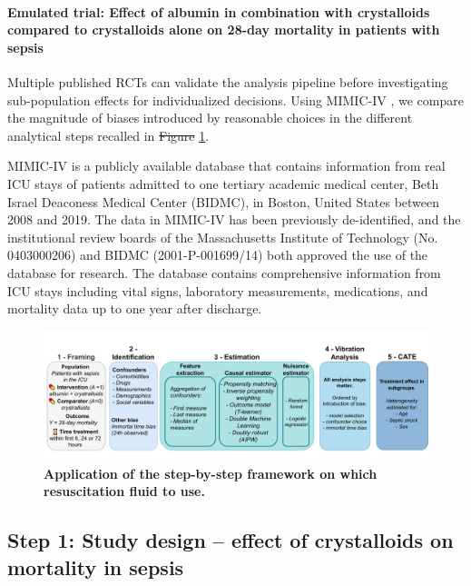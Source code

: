 \documentclass[10pt,letterpaper]{article}
\providecommand{\DIFaddtex}[1]{{\protect\color{blue}\uwave{#1}}} %
\providecommand{\DIFdeltex}[1]{{\protect\color{red}\sout{#1}}}                      %
\providecommand{\DIFaddbegin}{} %
\providecommand{\DIFaddend}{} %
\providecommand{\DIFdelbegin}{} %
\providecommand{\DIFdelend}{} %
\providecommand{\DIFaddbeginFL}{} %
\providecommand{\DIFaddendFL}{} %
\providecommand{\DIFdelbeginFL}{} %
\providecommand{\DIFdelendFL}{} %
\providecommand{\DIFadd}[1]{\texorpdfstring{\DIFaddtex{#1}}{#1}} %
\providecommand{\DIFdel}[1]{\texorpdfstring{\DIFdeltex{#1}}{}} %
\newcommand{\DIFscaledelfig}{0.5}
\newlength{\DIFdelgraphicswidth} %
\newlength{\DIFdelgraphicsheight} %
\newcommand{\DIFaddincludegraphics}[2][]{{\color{blue}\fbox{\DIFOincludegraphics[#1]{#2}}}} %
\newcommand{\DIFdelincludegraphics}[2][]{%
\sbox{\DIFdelgraphicsbox}{\DIFOincludegraphics[#1]{#2}}%
\settoboxwidth{\DIFdelgraphicswidth}{\DIFdelgraphicsbox} %
\settoboxtotalheight{\DIFdelgraphicsheight}{\DIFdelgraphicsbox} %
\scalebox{\DIFscaledelfig}{%
\parbox[b]{\DIFdelgraphicswidth}{\usebox{\DIFdelgraphicsbox}\\[-\baselineskip] \rule{\DIFdelgraphicswidth}{0em}}\llap{\resizebox{\DIFdelgraphicswidth}{\DIFdelgraphicsheight}{%
\setlength{\unitlength}{\DIFdelgraphicswidth}%
\begin{picture}(1,1)%
\thicklines\linethickness{2pt} %
{\color[rgb]{1,0,0}\put(0,0){\framebox(1,1){}}}%
{\color[rgb]{1,0,0}\put(0,0){\line( 1,1){1}}}%
{\color[rgb]{1,0,0}\put(0,1){\line(1,-1){1}}}%
\end{picture}%
}\hspace*{3pt}}} %
} %
\DeclareRobustCommand{\DIFaddbegin}{\DIFOaddbegin \let\includegraphics\DIFaddincludegraphics} %
\DeclareRobustCommand{\DIFaddend}{\DIFOaddend \let\includegraphics\DIFOincludegraphics} %
\DeclareRobustCommand{\DIFdelbegin}{\DIFOdelbegin \let\includegraphics\DIFdelincludegraphics} %
\DeclareRobustCommand{\DIFdelend}{\DIFOaddend \let\includegraphics\DIFOincludegraphics} %
\DeclareRobustCommand{\DIFaddbeginFL}{\DIFOaddbeginFL \let\includegraphics\DIFaddincludegraphics} %
\DeclareRobustCommand{\DIFaddendFL}{\DIFOaddendFL \let\includegraphics\DIFOincludegraphics} %
\DeclareRobustCommand{\DIFdelbeginFL}{\DIFOdelbeginFL \let\includegraphics\DIFdelincludegraphics} %
\DeclareRobustCommand{\DIFdelendFL}{\DIFOaddendFL \let\includegraphics\DIFOincludegraphics} %
\begin{document}
\paragraph{Emulated trial: Effect of albumin in combination with crystalloids
  compared to crystalloids alone on 28-day mortality in patients with sepsis}\label{emulated_trial}

Multiple published RCTs can validate the analysis pipeline before
investigating sub-population effects for individualized decisions. Using
MIMIC-IV \cite{johnson2020mimic}, we compare the magnitude of biases introduced by reasonable
choices in the different analytical steps recalled in \DIFdelbegin \DIFdel{Figure }\DIFdelend \DIFaddbegin \DIFadd{Fig }\DIFaddend \ref{fig:study_summary}.

MIMIC-IV is a publicly available database that contains information from real
ICU stays of patients admitted to one tertiary academic medical center, Beth
Israel Deaconess Medical Center (BIDMC), in Boston, United States between 2008
and 2019. The data in MIMIC-IV has been previously de-identified, and the
institutional review boards of the Massachusetts Institute of Technology (No.
0403000206) and BIDMC (2001-P-001699/14) both approved the use of the database
for research. The database contains comprehensive information from ICU stays
including vital signs, laboratory measurements, medications, and mortality data
up to one year after discharge.

\begin{figure}[h!]
  \centering
  \DIFdelbeginFL %
  \DIFdelendFL \DIFaddbeginFL \includegraphics[width=\linewidth]{img_final/Fig2.pdf}
  \DIFaddendFL \caption{\textbf{Application of the step-by-step framework on which resuscitation fluid to use.}}\label{fig:study_summary}
\end{figure}


\subsection*{Step 1: Study design -- effect of crystalloids on mortality in sepsis}%
\label{sec:framing_mimic_iv}
\end{document}
